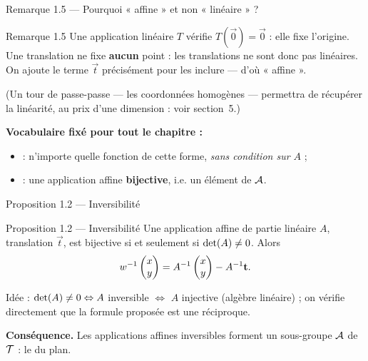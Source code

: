 \begin{frame}{Remarque 1.5 --- Pourquoi « affine » et non « linéaire » ?}
  \begin{Rem}{Remarque 1.5}
    Une application linéaire $T$ vérifie $T(\vec 0) = \vec 0$ : elle
    fixe l'origine. Une translation ne fixe \textbf{aucun} point : les
    translations ne sont donc pas linéaires. On ajoute le terme
    $\vec t$ précisément pour les inclure --- d'où « affine ».
  \end{Rem}
  \vspace{6pt}
  \small (Un tour de passe-passe --- les coordonnées homogènes ---
  permettra de récupérer la linéarité, au prix d'une dimension : voir
  section~5.)

  \vspace{10pt}
  \textbf{Vocabulaire fixé pour tout le chapitre :}
  \begin{itemize}
    \item {} : n'importe quelle fonction de
      cette forme, \emph{sans condition sur $A$} ;
    \item {} : une application affine
      \textbf{bijective}, i.e. un élément de $\mathcal{A}$.
  \end{itemize}
\end{frame}

\begin{frame}{Proposition 1.2 --- Inversibilité}
  \begin{Enonce}{Proposition 1.2 --- Inversibilité}
    \small Une application affine de partie linéaire $A$, translation
    $\vec t$, est bijective si et seulement si $\operatorname{det}(A) \neq 0$. Alors
    \[
      w^{-1}\begin{pmatrix}x\\ y\end{pmatrix} = A^{-1}\begin{pmatrix}x\\ y\end{pmatrix} - A^{-1}\mathbf{t}.
    \]
  \end{Enonce}
  \begin{AuTableau}
    \small Idée : $\operatorname{det}(A)\neq 0 \Leftrightarrow A$ inversible
    $\Leftrightarrow$ $A$ injective (algèbre linéaire) ; on vérifie
    directement que la formule proposée est une réciproque.
  \end{AuTableau}
  \vspace{6pt}
  \textbf{Conséquence.} Les applications affines inversibles forment un
  sous-groupe $\mathcal{A}$ de $\mathcal{T}$ : le  du plan.
\end{frame}

